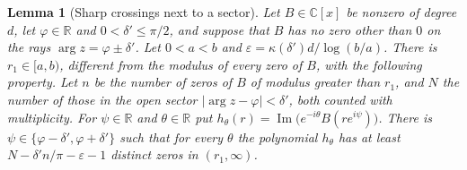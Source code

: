 \documentclass[11pt]{article}
\newtheorem{lemma}[theorem]{Lemma}
\newcommand{\R}{\mathbb R}
\begin{document}
\begin{lemma}[Sharp crossings next to a sector]\label{lem:sharpcross}
Let $B\in\mathbb C[x]$ be nonzero of degree $d$, let $\varphi\in\R$ and
$0<\delta'\le\pi/2$, and suppose that $B$ has no zero other than $0$ on the
rays $\arg z=\varphi\pm\delta'$.  Let $0<a<b$ and
$\varepsilon=\kappa(\delta')d/\log(b/a)$.  There is $r_1\in[a,b)$, different
from the modulus of every zero of $B$, with the following property.  Let $n$
be the number of zeros of $B$ of modulus greater than $r_1$, and $N$ the
number of those in the open sector $|\arg z-\varphi|<\delta'$, both counted
with multiplicity.  For $\psi\in\R$ and $\theta\in\R$ put
$h_\theta(r)=\operatorname{Im}\bigl(e^{-i\theta}B(re^{i\psi})\bigr)$.
There is $\psi\in\{\varphi-\delta',\varphi+\delta'\}$ such that for
every $\theta$ the polynomial $h_\theta$ has at least
$N-\delta'n/\pi-\varepsilon-1$ distinct zeros in $(r_1,\infty)$.
\end{lemma}
\end{document}
